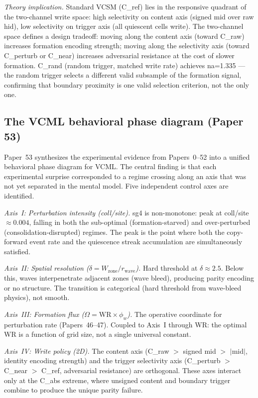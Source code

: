 \documentclass[11pt]{article}
\begin{document}
\textit{Theory implication.}
Standard VCSM (C\_ref) lies in the responsive quadrant of the two-channel write space:
high selectivity on content axis (signed mid over raw hid), low selectivity on
trigger axis (all quiescent cells write).
The two-channel space defines a design tradeoff:
moving along the content axis (toward C\_raw) increases formation encoding strength;
moving along the selectivity axis (toward C\_perturb or C\_near) increases adversarial
resistance at the cost of slower formation.
C\_rand (random trigger, matched write rate) achieves na=1.335 --- the random trigger
selects a different valid subsample of the formation signal, confirming that
boundary proximity is one valid selection criterion, not the only one.

\subsection{The VCML behavioral phase diagram (Paper 53)}
\label{subsec:paper53}

Paper~53 synthesizes the experimental evidence from Papers~0--52 into a
unified behavioral phase diagram for VCML.
The central finding is that each experimental surprise corresponded to a regime
crossing along an axis that was not yet separated in the mental model.
Five independent control axes are identified.

\textit{Axis~I: Perturbation intensity (coll/site).}
sg4 is non-monotone: peak at coll/site~$\approx 0.004$,
falling in both the sub-optimal (formation-starved) and over-perturbed
(consolidation-disrupted) regimes.
The peak is the point where both the copy-forward event rate and the
quiescence streak accumulation are simultaneously satisfied.

\textit{Axis~II: Spatial resolution ($\delta = W_\text{zone}/r_\text{wave}$).}
Hard threshold at $\delta \approx 2.5$.
Below this, waves interpenetrate adjacent zones (wave bleed), producing parity
encoding or no structure.
The transition is categorical (hard threshold from wave-bleed physics), not
smooth.

\textit{Axis~III: Formation flux ($\Omega = \mathrm{WR} \times \phi_w$).}
The operative coordinate for perturbation rate (Papers~46--47).
Coupled to Axis~I through WR: the optimal WR is a function of grid size, not
a single universal constant.

\textit{Axis~IV: Write policy (2D).}
The content axis (C\_raw $>$ signed mid $>$ $|$mid$|$, identity encoding
strength) and the trigger selectivity axis (C\_perturb $>$ C\_near $>$ C\_ref,
adversarial resistance) are orthogonal.
These axes interact only at the C\_abs extreme, where unsigned content and
boundary trigger combine to produce the unique parity failure.
\end{document}
